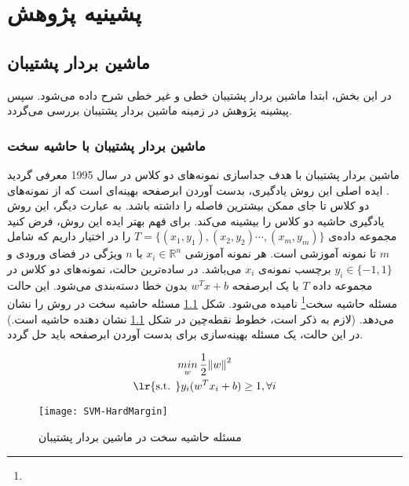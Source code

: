 
\chapter{پشینیه پژوهش} \label{ch:2}
\section{ماشین بردار پشتیبان} \label{sec:2:1}
در این بخش، ابتدا ماشین بردار پشتیبان خطی و غیر خطی شرح داده می‌شود. سپس پیشینه پژوهش در زمینه ماشین بردار پشتیبان بررسی می‌گردد.
\subsection{ماشین بردار پشتیبان با حاشیه سخت} \label{sec:2:1:1}
ماشین بردار پشتیبان با هدف جداسازی نمونه‌های دو کلاس در سال 1995 معرفی گردید \cite{vapnik1995}. ایده اصلی این روش یادگیری، بدست آوردن ابرصفحه بهینه‌ای است که از نمونه‌های دو کلاس تا جای ممکن بیشترین فاصله را داشته باشد. به عبارت دیگر، این روش یادگیری حاشیه دو کلاس را بیشینه می‌کند. برای فهم بهتر ایده این روش، فرض کنید مجموعه داده‌ی $T=\{(x_1, y_1),(x_2, y_2) \cdots , (x_m, y_m)\}$ را در اختیار داریم که شامل $m$ تا نمونه آموزشی است. هر نمونه آموزشی $x_{i} \in \mathbb{R}^{n}$ با $n$ ویژگی در فضای ورودی و $y_i \in \{-1,1\}$ برچسب نمونه‌ی $x_i$ می‌باشد. در ساده‌ترین حالت، نمونه‌های دو کلاس در مجموعه داده $T$ با یک ابرصفحه $w^{T}x+b$ بدون خطا دسته‌بندی می‌شود. این حالت مسئله حاشیه سخت\footnote{}  نامیده می‌شود. شکل \ref{fig:SVM-HM} مسئله حاشیه سخت در روش  را نشان می‌دهد. (لازم به ذکر است، خطوط نقطه‌چین در شکل ‏\ref{fig:SVM-HM} نشان دهنده حاشیه است.) در این حالت، یک مسئله بهینه‌سازی برای بدست آوردن ابرصفحه باید حل گردد.

\begin{equation}
\begin{gathered} 
\mathop{min}\limits_{w}\frac{1}{2}{{\left\| w \right\|}^{2}} \\
\textrm{\lr{s.t. }} {{y}_{i}}({{w}^T}{{x}_{i}}+b)\ge 1,\forall i
\end{gathered}
\label{eq:1}
\end{equation}

\begin{figure}[!t]
	\centering
	\texttt{[image: SVM-HardMargin]}
	\caption{مسئله حاشیه سخت در ماشین بردار پشتیبان}
	\label{fig:SVM-HM}
\end{figure}

